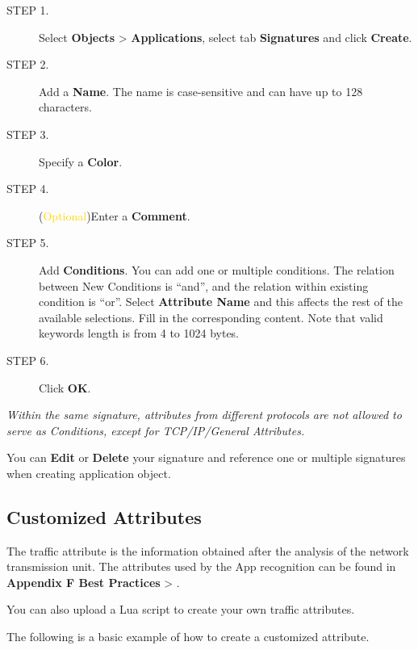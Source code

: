 \begin{description}
    \item[STEP 1.]	Select \textbf{Objects} > \textbf{Applications}, select tab \textbf{Signatures} and click \textbf{Create}.
    \item[STEP 2.]	Add a \textbf{Name}. The name is case-sensitive and can have up to 128 characters.
    \item[STEP 3.]	Specify a \textbf{Color}.
    \item[STEP 4.]	(\textcolor{gold}{Optional})Enter a \textbf{Comment}.
    \item[STEP 5.]	Add \textbf{Conditions}. You can add one or multiple conditions. The relation between New Conditions is “and”, and the relation within existing condition is “or”. 
    Select \textbf{Attribute Name} and this affects the rest of the available selections. Fill in the corresponding content. Note that valid keywords length is from 4 to 1024 bytes.
    \item[STEP 6.]	Click \textbf{OK}.
\end{description}

\notemark\textit{Within the same signature, attributes from different protocols are not allowed to serve as Conditions, except for TCP/IP/General Attributes.}


You can \textbf{Edit} or \textbf{Delete} your signature and reference one or multiple signatures when creating application object.

\subsection*{\hypertarget{link:Customized Attributes}{Customized Attributes}}
\label{sec:objects:application:attribute}

The traffic attribute is the information obtained after the analysis of the network transmission unit. The attributes used by the App recognition can be found in \textbf{Appendix F Best Practices} > \textbf{\hyperlink{link:Custom Application}{\color{linkblue}{Custom Application}}}.


You can also upload a Lua script to create your own traffic attributes.


The following is a basic example of how to create a customized attribute.

